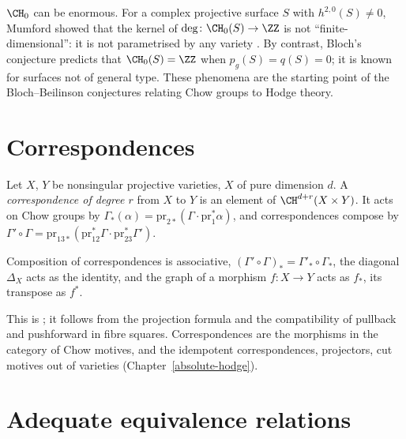 \begin{example}\label{intersection-theory:example-chow-zero-surfaces}
$\CH_0$ can be enormous. For a complex projective surface $S$ with $h^{2,0}(S) \neq 0$, Mumford showed that the kernel of $\deg \colon \CH_0(S) \to \ZZ$ is not ``finite-dimensional'':
it is not parametrised by any variety \cite{mumford-1968}. By contrast, Bloch's conjecture predicts that $\CH_0(S) = \ZZ$ when $p_g(S) = q(S) = 0$; it is known for surfaces not of
general type. These phenomena are the starting point of the Bloch--Beilinson conjectures relating Chow groups to Hodge theory.
\end{example}

\section{Correspondences}\label{intersection-theory:section-correspondences}

\begin{definition}\label{intersection-theory:definition-correspondence}
Let $X$, $Y$ be nonsingular projective varieties, $X$ of pure dimension $d$. A \emph{correspondence of degree $r$} from $X$ to $Y$ is an element of $\CH^{d+r}(X \times Y)$. It acts on
Chow groups by $\Gamma_*(\alpha) = \mathrm{pr}_{2*}(\Gamma \cdot \mathrm{pr}_1^*\alpha)$, and correspondences compose by
$\Gamma' \circ \Gamma = \mathrm{pr}_{13*}(\mathrm{pr}_{12}^*\Gamma \cdot \mathrm{pr}_{23}^*\Gamma')$.
\end{definition}

\begin{proposition}\label{intersection-theory:proposition-correspondences}
Composition of correspondences is associative, $(\Gamma' \circ \Gamma)_* = \Gamma'_* \circ \Gamma_*$, the diagonal $\Delta_X$ acts as the identity, and the graph of a morphism
$f \colon X \to Y$ acts as $f_*$, its transpose as $f^*$.
\end{proposition}

This is \cite[Proposition 16.1.1]{fulton-intersection}; it follows from the projection formula and the compatibility of pullback and pushforward in fibre squares. Correspondences are
the morphisms in the category of Chow motives, and the idempotent correspondences, projectors, cut motives out of varieties (Chapter~\ref{absolute-hodge}).

\section{Adequate equivalence relations}\label{intersection-theory:section-equivalences}

